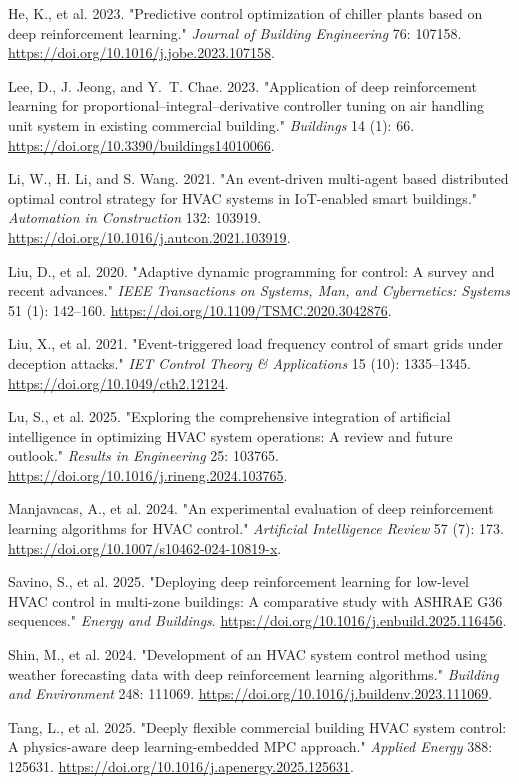 \documentclass[preprint,12pt]{elsarticle}
\newenvironment{reflist}{%
  \begin{list}{}{%
    \setlength{\leftmargin}{2.2em}%
    \setlength{\itemindent}{-2.2em}%
    \setlength{\itemsep}{2pt}%
    \setlength{\parsep}{0pt}%
  }%
  \raggedright
}{%
  \end{list}
}
\begin{document}
\begin{reflist}
\item He, K., et al. 2023. "Predictive control optimization of chiller plants based on deep reinforcement learning." \textit{Journal of Building Engineering} 76: 107158. \url{https://doi.org/10.1016/j.jobe.2023.107158}.
\item Lee, D., J. Jeong, and Y.~T. Chae. 2023. "Application of deep reinforcement learning for proportional--integral--derivative controller tuning on air handling unit system in existing commercial building." \textit{Buildings} 14 (1): 66. \url{https://doi.org/10.3390/buildings14010066}.
\item Li, W., H. Li, and S. Wang. 2021. "An event-driven multi-agent based distributed optimal control strategy for HVAC systems in IoT-enabled smart buildings." \textit{Automation in Construction} 132: 103919. \url{https://doi.org/10.1016/j.autcon.2021.103919}.
\item Liu, D., et al. 2020. "Adaptive dynamic programming for control: A survey and recent advances." \textit{IEEE Transactions on Systems, Man, and Cybernetics: Systems} 51 (1): 142--160. \url{https://doi.org/10.1109/TSMC.2020.3042876}.
\item Liu, X., et al. 2021. "Event-triggered load frequency control of smart grids under deception attacks." \textit{IET Control Theory \& Applications} 15 (10): 1335--1345. \url{https://doi.org/10.1049/cth2.12124}.
\item Lu, S., et al. 2025. "Exploring the comprehensive integration of artificial intelligence in optimizing HVAC system operations: A review and future outlook." \textit{Results in Engineering} 25: 103765. \url{https://doi.org/10.1016/j.rineng.2024.103765}.
\item Manjavacas, A., et al. 2024. "An experimental evaluation of deep reinforcement learning algorithms for HVAC control." \textit{Artificial Intelligence Review} 57 (7): 173. \url{https://doi.org/10.1007/s10462-024-10819-x}.
\item Savino, S., et al. 2025. "Deploying deep reinforcement learning for low-level HVAC control in multi-zone buildings: A comparative study with ASHRAE G36 sequences." \textit{Energy and Buildings}. \url{https://doi.org/10.1016/j.enbuild.2025.116456}.
\item Shin, M., et al. 2024. "Development of an HVAC system control method using weather forecasting data with deep reinforcement learning algorithms." \textit{Building and Environment} 248: 111069. \url{https://doi.org/10.1016/j.buildenv.2023.111069}.
\item Tang, L., et al. 2025. "Deeply flexible commercial building HVAC system control: A physics-aware deep learning-embedded MPC approach." \textit{Applied Energy} 388: 125631. \url{https://doi.org/10.1016/j.apenergy.2025.125631}.

\end{reflist}
\end{document}
